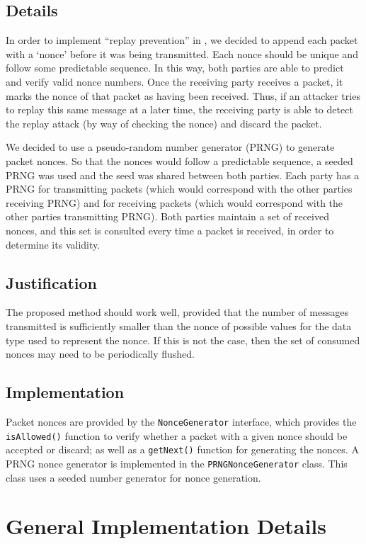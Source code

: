 \documentclass[a4paper,11pt]{article}
\begin{document}
\subsection{Details}
In order to implement ``replay prevention'' in \packageName{}, we decided to 
append each packet with a `nonce' before it was being transmitted. Each nonce 
should be unique and follow some predictable sequence. In this way, both parties
are able to predict and verify valid nonce numbers. Once the receiving party 
receives a packet, it marks the nonce of that packet as having been received. 
Thus, if an attacker tries to replay this same message at a later time, the 
receiving party is able to detect the replay attack (by way of checking the 
nonce) and discard the packet.

We decided to use a pseudo-random number generator (PRNG) to generate packet 
nonces. So that the nonces would follow a predictable sequence, a seeded PRNG
was used and the seed was shared between both parties. Each party has a PRNG for
transmitting packets (which would correspond with the other parties receiving 
PRNG) and for receiving packets (which would correspond with the other parties 
transmitting PRNG). Both parties maintain a set of received nonces, and this 
set is consulted every time a packet is received, in order to determine its
validity.

\subsection{Justification}
The proposed method should work well, provided that the number of messages 
transmitted is sufficiently smaller than the nonce of possible values for the 
data type used to represent the nonce. If this is not the case, then the set of 
consumed nonces may need to be periodically flushed.

\subsection{Implementation}
Packet nonces are provided by the \verb+NonceGenerator+ interface, which 
provides the \verb+isAllowed()+ function to verify whether a packet with a given
nonce should be accepted or discard; as well as a \verb+getNext()+ function for
generating the nonces. A PRNG nonce generator is implemented in the 
\verb+PRNGNonceGenerator+ class. This class uses a seeded number generator for
nonce generation.

\section{General Implementation Details}
\end{document}

